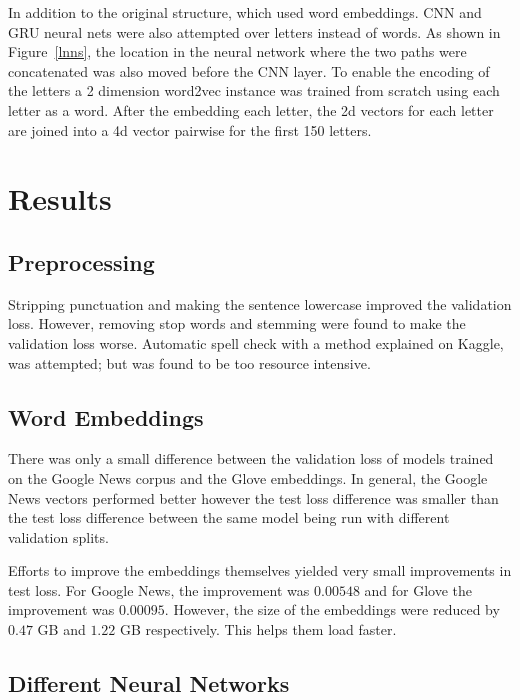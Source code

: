 \documentclass{article}
\begin{document}
In addition to the original structure, which used word embeddings. CNN and GRU neural nets were also attempted over letters instead of words. As shown in Figure~\ref{lnns}, the location in the neural network where the two paths were concatenated was also moved before the CNN layer. To enable the encoding of the letters a 2 dimension word2vec instance was trained from scratch using each letter as a word. After the embedding each letter, the 2d vectors for each letter are joined into a 4d vector pairwise for the first 150 letters.

\section{Results}

\subsection{Preprocessing}

Stripping punctuation and making the sentence lowercase improved the validation loss. However, removing stop words and stemming were found to make the validation loss worse. Automatic spell check with a method explained on Kaggle, was attempted; but was found to be too resource intensive.

\subsection{Word Embeddings}

There was only a small difference between the validation loss of models trained on the Google News corpus and the Glove embeddings. In general, the Google News vectors performed better however the test loss difference was smaller than the test loss difference between the same model being run with different validation splits.

Efforts to improve the embeddings themselves yielded very small improvements in test loss. For Google News, the improvement was $0.00548$ and for Glove the improvement was $0.00095$. However, the size of the embeddings were reduced by $0.47$ GB and $1.22$ GB respectively. This helps them load faster.

\subsection{Different Neural Networks}
\end{document}
